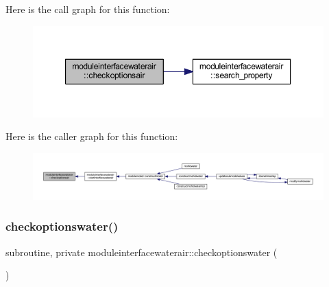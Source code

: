 Here is the call graph for this function\+:\nopagebreak
\begin{figure}[H]
\begin{center}
\leavevmode
\includegraphics[width=350pt]{namespacemoduleinterfacewaterair_afa8defb4c07e4d9150f1507fc3ea475a_cgraph}
\end{center}
\end{figure}
Here is the caller graph for this function\+:\nopagebreak
\begin{figure}[H]
\begin{center}
\leavevmode
\includegraphics[width=350pt]{namespacemoduleinterfacewaterair_afa8defb4c07e4d9150f1507fc3ea475a_icgraph}
\end{center}
\end{figure}
\mbox{\label{namespacemoduleinterfacewaterair_a6ca031d04555d7ec7193b26144ed978f}} 
\subsubsection{\texorpdfstring{checkoptionswater()}{checkoptionswater()}}
{\footnotesize\ttfamily subroutine, private moduleinterfacewaterair\+::checkoptionswater (\begin{DoxyParamCaption}{ }\end{DoxyParamCaption})\hspace{0.3cm}{\ttfamily [private]}}

